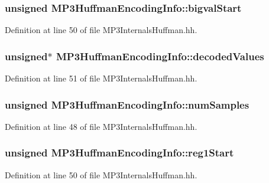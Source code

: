 \subsubsection[{bigval\+Start}]{\setlength{\rightskip}{0pt plus 5cm}unsigned M\+P3\+Huffman\+Encoding\+Info\+::bigval\+Start}\label{classMP3HuffmanEncodingInfo_ad5d778202f2bdd13aa15751ec277b9d0}


Definition at line 50 of file M\+P3\+Internals\+Huffman.\+hh.

\subsubsection[{decoded\+Values}]{\setlength{\rightskip}{0pt plus 5cm}unsigned$\ast$ M\+P3\+Huffman\+Encoding\+Info\+::decoded\+Values}\label{classMP3HuffmanEncodingInfo_afef16bfff4812de6a9b4caa465977409}


Definition at line 51 of file M\+P3\+Internals\+Huffman.\+hh.

\subsubsection[{num\+Samples}]{\setlength{\rightskip}{0pt plus 5cm}unsigned M\+P3\+Huffman\+Encoding\+Info\+::num\+Samples}\label{classMP3HuffmanEncodingInfo_a0ea97838cb8bf9a054816a135caed339}


Definition at line 48 of file M\+P3\+Internals\+Huffman.\+hh.

\subsubsection[{reg1\+Start}]{\setlength{\rightskip}{0pt plus 5cm}unsigned M\+P3\+Huffman\+Encoding\+Info\+::reg1\+Start}\label{classMP3HuffmanEncodingInfo_a0d9d1f2fcb2c9e8f4c805173c58cfc56}


Definition at line 50 of file M\+P3\+Internals\+Huffman.\+hh.

